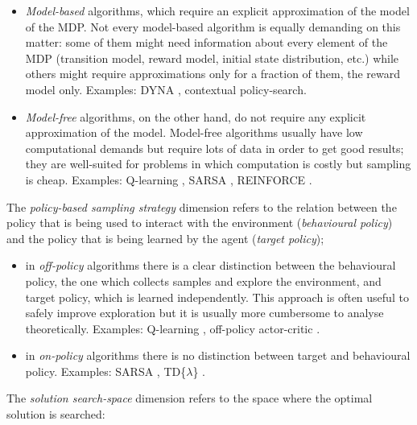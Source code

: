 \begin{itemize}
\item \emph{Model-based} algorithms, which require an explicit approximation of the model of the \gls{MDP}. Not every model-based algorithm is equally demanding on this matter: some of them might need information about every element of the \gls{MDP} (transition model,  reward model, initial state distribution, etc.) while others might require approximations only for a fraction of them, \eg the reward model only. Examples: DYNA \cite{sutton1991dyna}, contextual policy-search\cite{kupcsik2013data}.
\item \emph{Model-free} algorithms, on the other hand, do not require any explicit approximation of the model. Model-free algorithms usually have low computational demands but require lots of data in order to get good results; they are well-suited for problems in which computation is costly but sampling is cheap. Examples: Q-learning \cite{watkins1989learning}, SARSA \cite{rummery1994line}, REINFORCE \cite{williams1992simple}.
\end{itemize}

The \emph{policy-based sampling strategy} dimension refers to the relation between the policy that is being used to interact with the environment (\emph{behavioural policy}) and the policy that is being learned by the agent (\emph{target policy});

\begin{itemize}
\item in \emph{off-policy} algorithms there is a clear distinction between the behavioural policy, the one which collects samples and explore the environment, and target policy, which is learned independently. This approach is often useful to safely improve exploration but it is usually more cumbersome to analyse theoretically. Examples: Q-learning \cite{watkins1989learning}, off-policy actor-critic \cite{degris2012off}.
\item in \emph{on-policy} algorithms there is no distinction between target and behavioural policy. Examples: SARSA \cite{rummery1994line}, TD\{$\lambda$\} \cite{sutton1988learning}.
\end{itemize}

The \emph{solution search-space} dimension refers to the space where the optimal solution is searched:

